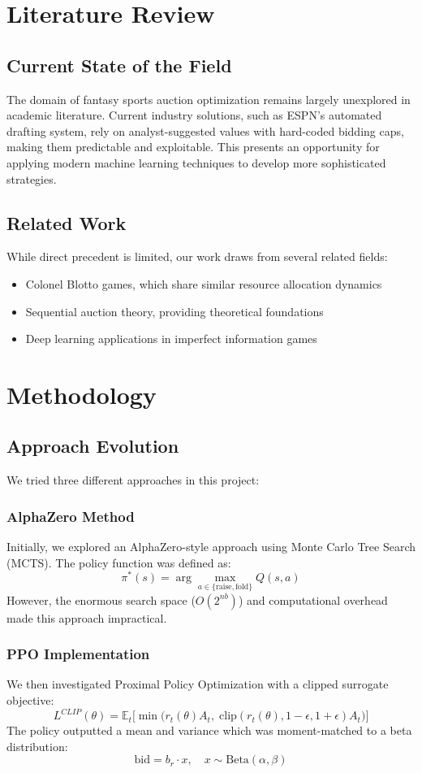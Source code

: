 \documentclass[11pt]{article}
\begin{document}
\section{Literature Review}
\subsection{Current State of the Field}
The domain of fantasy sports auction optimization remains largely unexplored in academic literature. Current industry solutions, such as ESPN's automated drafting system, rely on analyst-suggested values with hard-coded bidding caps, making them predictable and exploitable. This presents an opportunity for applying modern machine learning techniques to develop more sophisticated strategies.

\subsection{Related Work}
While direct precedent is limited, our work draws from several related fields:
\begin{itemize}
    \item Colonel Blotto games, which share similar resource allocation dynamics
    \item Sequential auction theory, providing theoretical foundations
    \item Deep learning applications in imperfect information games
\end{itemize}

\section{Methodology}
\subsection{Approach Evolution}
We tried three different approaches in this project:

\subsubsection{AlphaZero Method}
Initially, we explored an AlphaZero-style approach using Monte Carlo Tree Search (MCTS). The policy function was defined as:
\[
\pi^*(s) = \arg\max_{a \in \{\text{raise}, \text{fold}\}} Q(s, a)
\]
However, the enormous search space ($O(2^{nb})$) and computational overhead made this approach impractical.

\subsubsection{PPO Implementation}
We then investigated Proximal Policy Optimization with a clipped surrogate objective:
\[
L^{CLIP}(\theta) = \mathbb{E}_t \Big[\min\big(r_t(\theta) A_t,\; \text{clip}(r_t(\theta), 1-\epsilon, 1+\epsilon) A_t\big)\Big]
\]
The policy outputted a mean and variance which was moment-matched to a beta distribution:
\[
\text{bid} = b_r \cdot x, \quad x \sim \text{Beta}(\alpha, \beta)
\]
\end{document}
